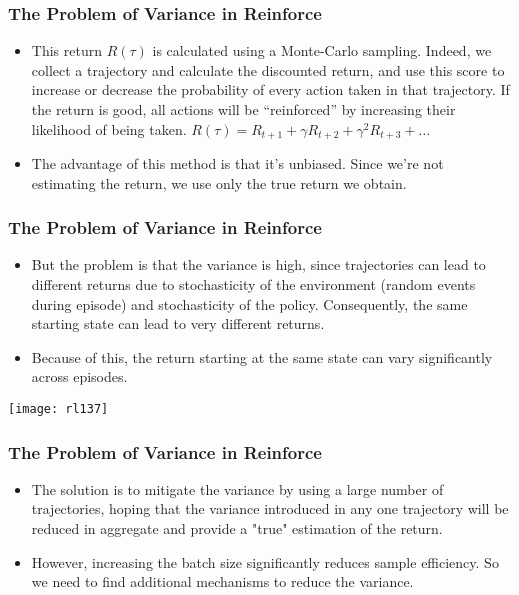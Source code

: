 \begin{frame}[fragile]\frametitle{The Problem of Variance in Reinforce}


\begin{itemize}
\item This return $R(\tau)$ is calculated using a Monte-Carlo sampling. Indeed, we collect a trajectory and calculate the discounted return, and use this score to increase or decrease the probability of every action taken in that trajectory. If the return is good, all actions will be “reinforced” by increasing their likelihood of being taken. $R(\tau) = R_{t+1} + \gamma R_{t+2} + \gamma^2 R_{t+3} + \ldots$
\item The advantage of this method is that it’s unbiased. Since we’re not estimating the return, we use only the true return we obtain.

\end{itemize}



\end{frame}

\begin{frame}[fragile]\frametitle{The Problem of Variance in Reinforce}


\begin{itemize}
\item But the problem is that the variance is high, since trajectories can lead to different returns due to stochasticity of the environment (random events during episode) and stochasticity of the policy. Consequently, the same starting state can lead to very different returns. 
\item Because of this, the return starting at the same state can vary significantly across episodes.
\end{itemize}

\begin{center}
\texttt{[image: rl137]}
\end{center}


\end{frame}



\begin{frame}[fragile]\frametitle{The Problem of Variance in Reinforce}


\begin{itemize}
\item The solution is to mitigate the variance by using a large number of trajectories, hoping that the variance introduced in any one trajectory will be reduced in aggregate and provide a "true" estimation of the return.
\item 
However, increasing the batch size significantly reduces sample efficiency. So we need to find additional mechanisms to reduce the variance.
\end{itemize}


\end{frame}


